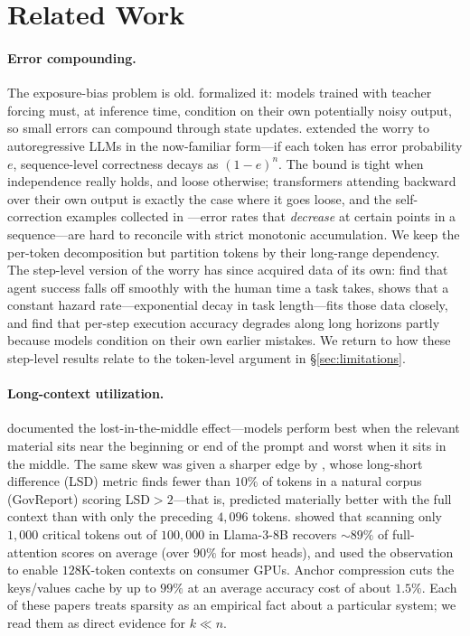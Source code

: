 \section{Related Work}
\label{sec:related}

\paragraph{Error compounding.}
The exposure-bias problem is old. \citet{bengio2015scheduled} formalized it: models trained with teacher forcing must, at inference time, condition on their own potentially noisy output, so small errors can compound through state updates. \citet{lecun2023why} extended the worry to autoregressive LLMs in the now-familiar form---if each token has error probability $e$, sequence-level correctness decays as $(1-e)^n$. The bound is tight when independence really holds, and loose otherwise; transformers attending backward over their own output is exactly the case where it goes loose, and the self-correction examples collected in \citet{gwern2023inner}---error rates that \emph{decrease} at certain points in a sequence---are hard to reconcile with strict monotonic accumulation. We keep the per-token decomposition but partition tokens by their long-range dependency. The step-level version of the worry has since acquired data of its own: \citet{kwa2025measuring} find that agent success falls off smoothly with the human time a task takes, \citet{ord2025halflife} shows that a constant hazard rate---exponential decay in task length---fits those data closely, and \citet{sinha2025illusion} find that per-step execution accuracy degrades along long horizons partly because models condition on their own earlier mistakes. We return to how these step-level results relate to the token-level argument in \S\ref{sec:limitations}.

\paragraph{Long-context utilization.}
\citet{liu2023lost} documented the lost-in-the-middle effect---models perform best when the relevant material sits near the beginning or end of the prompt and worst when it sits in the middle. The same skew was given a sharper edge by \citet{fang2024what}, whose long-short difference (LSD) metric finds fewer than $10\%$ of tokens in a natural corpus (GovReport) scoring LSD$>2$---that is, predicted materially better with the full context than with only the preceding $4{,}096$ tokens. \citet{liu2024retrieval} showed that scanning only $1{,}000$ critical tokens out of $100{,}000$ in Llama-3-8B recovers $\sim 89\%$ of full-attention scores on average (over $90\%$ for most heads), and used the observation to enable $128$K-token contexts on consumer GPUs. Anchor compression \citep{pang2024anchor} cuts the keys/values cache by up to $99\%$ at an average accuracy cost of about $1.5\%$. Each of these papers treats sparsity as an empirical fact about a particular system; we read them as direct evidence for $k \ll n$.


